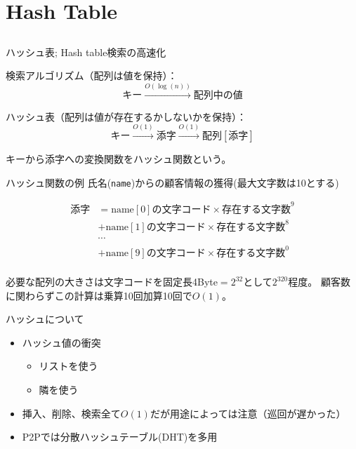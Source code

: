 \documentclass{beamer}
\subtitle{木、グラフ、アルゴリズム}
\begin{document}
\begin{frame}[fragile]{}
\titlepage
\end{frame}

\section{Hash Table}		%
\subsection{}

\begin{frame}[fragile]{ハッシュ表; Hash table}{検索の高速化}

検索アルゴリズム（配列は値を保持）：
\[
キー \stackrel{O(\log(n))}{\longrightarrow} 配列中の値
\]

\vfill
ハッシュ表（配列は値が存在するかしないかを保持）：
\[
キー \stackrel{O(1)}{\longrightarrow} 添字 \stackrel{O(1)}{\longrightarrow} 配列[添字]
\]

\vfill
キーから添字への変換関数をハッシュ関数という。
\end{frame}

\begin{frame}[fragile]{ハッシュ関数の例}{}
氏名(\texttt{name})からの顧客情報の獲得(最大文字数は10とする)

\begin{align*}
添字
&= \text{name}[0]の文字コード\times \text{存在する文字数}^{9}\\
&+ \text{name}[1]の文字コード\times \text{存在する文字数}^{8}\\
& \cdots \\ 
&+ \text{name}[9]の文字コード\times \text{存在する文字数}^{0}\\
\end{align*}

必要な配列の大きさは文字コードを固定長4Byte$=2^{32}$として$2^{320}$程度。
顧客数に関わらずこの計算は乗算10回加算10回で$O(1)$。
\end{frame}

\begin{frame}[fragile]{ハッシュについて}{}
\begin{itemize}\itemsep8pt
\item ハッシュ値の衝突
\begin{itemize}\itemsep8pt
\item リストを使う
\item 隣を使う
\end{itemize}
\item 挿入、削除、検索全て$O(1)$だが用途によっては注意（巡回が遅かった）
\item P2Pでは分散ハッシュテーブル(DHT)を多用
\end{itemize}
\end{frame}
\end{document}
